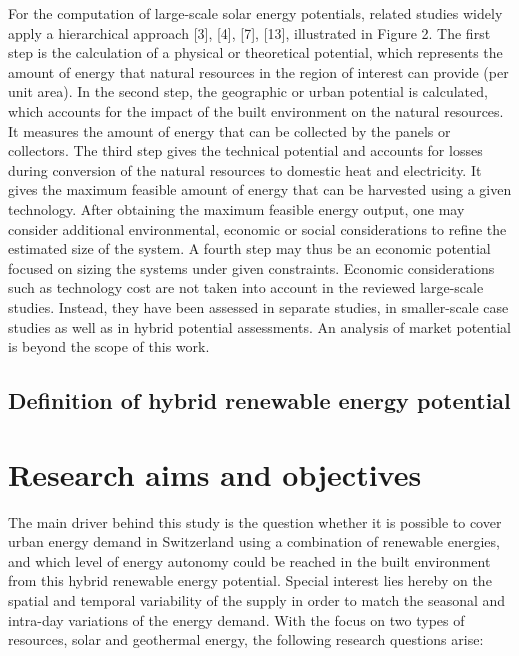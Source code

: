 For the computation of large-scale solar energy potentials, related studies widely apply a hierarchical approach [3], [4], [7], [13], illustrated in Figure 2. The first step is the calculation of a physical or theoretical potential, which represents the amount of energy that natural resources in the region of interest can provide (per unit area). In the second step, the geographic or urban potential is calculated, which accounts for the impact of the built environment on the natural resources. It measures the amount of energy that can be collected by the panels or collectors. The third step gives the technical potential and accounts for losses during conversion of the natural resources to domestic heat and electricity. It gives the maximum feasible amount of energy that can be harvested using a given technology. After obtaining the maximum feasible energy output, one may consider additional environmental, economic or social considerations to refine the estimated size of the system. A fourth step may thus be an economic potential focused on sizing the systems under given constraints. Economic considerations such as technology cost are not taken into account in the reviewed large-scale studies. Instead, they have been assessed in separate studies, in smaller-scale case studies as well as in hybrid potential assessments. An analysis of market potential is beyond the scope of this work. 
 

\subsection{Definition of hybrid renewable energy potential}

\section{Research aims and objectives}
\label{intro_goals}
The main driver behind this study is the question whether it is possible to cover urban energy demand in Switzerland using a combination of renewable energies, and which level of energy autonomy could be reached in the built environment from this hybrid renewable energy potential. Special interest lies hereby on the spatial and temporal variability of the supply in order to match the seasonal and intra-day variations of the energy demand. With the focus on two types of resources, solar and geothermal energy, the following research questions arise:


